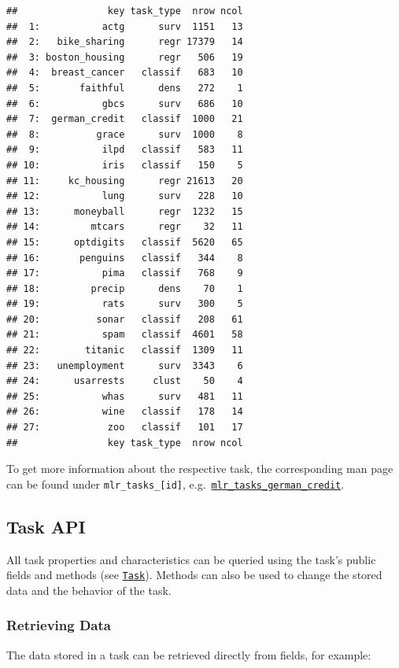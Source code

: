 \documentclass[
]{scrbook}
\begin{document}
\begin{verbatim}
##                key task_type  nrow ncol
##  1:           actg      surv  1151   13
##  2:   bike_sharing      regr 17379   14
##  3: boston_housing      regr   506   19
##  4:  breast_cancer   classif   683   10
##  5:       faithful      dens   272    1
##  6:           gbcs      surv   686   10
##  7:  german_credit   classif  1000   21
##  8:          grace      surv  1000    8
##  9:           ilpd   classif   583   11
## 10:           iris   classif   150    5
## 11:     kc_housing      regr 21613   20
## 12:           lung      surv   228   10
## 13:      moneyball      regr  1232   15
## 14:         mtcars      regr    32   11
## 15:      optdigits   classif  5620   65
## 16:       penguins   classif   344    8
## 17:           pima   classif   768    9
## 18:         precip      dens    70    1
## 19:           rats      surv   300    5
## 20:          sonar   classif   208   61
## 21:           spam   classif  4601   58
## 22:        titanic   classif  1309   11
## 23:   unemployment      surv  3343    6
## 24:      usarrests     clust    50    4
## 25:           whas      surv   481   11
## 26:           wine   classif   178   14
## 27:            zoo   classif   101   17
##                key task_type  nrow ncol
\end{verbatim}

To get more information about the respective task, the corresponding man page can be found under \texttt{mlr\_tasks\_{[}id{]}}, e.g.~\href{https://mlr3.mlr-org.com/reference/mlr_tasks_german_credit.html}{\texttt{mlr\_tasks\_german\_credit}}.

\hypertarget{tasks-api}{%
\subsection{Task API}\label{tasks-api}}

All task properties and characteristics can be queried using the task's public fields and methods (see \href{https://mlr3.mlr-org.com/reference/Task.html}{\texttt{Task}}).
Methods can also be used to change the stored data and the behavior of the task.

\hypertarget{tasks-retrieving}{%
\subsubsection{Retrieving Data}\label{tasks-retrieving}}

The data stored in a task can be retrieved directly from fields, for example:
\end{document}
